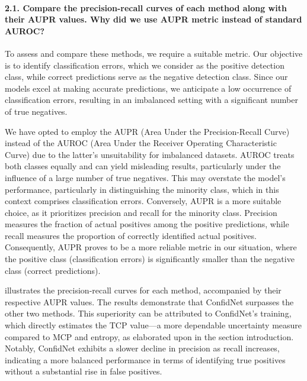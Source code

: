\paragraph*{2.1. Compare the precision-recall curves of each method along with their AUPR values. Why did we use AUPR metric instead of standard AUROC?}
To assess and compare these methods, we require a suitable metric. Our objective is to identify classification errors, which we consider as the positive detection class, while correct predictions serve as the negative detection class. Since our models excel at making accurate predictions, we anticipate a low occurrence of classification errors, resulting in an imbalanced setting with a significant number of true negatives.

We have opted to employ the AUPR (Area Under the Precision-Recall Curve) instead of the AUROC (Area Under the Receiver Operating Characteristic Curve) due to the latter's unsuitability for imbalanced datasets. AUROC treats both classes equally and can yield misleading results, particularly under the influence of a large number of true negatives. This may overstate the model's performance, particularly in distinguishing the minority class, which in this context comprises classification errors. Conversely, AUPR is a more suitable choice, as it prioritizes precision and recall for the minority class. Precision measures the fraction of actual positives among the positive predictions, while recall measures the proportion of correctly identified actual positives. Consequently, AUPR proves to be a more reliable metric in our situation, where the positive class (classification errors) is significantly smaller than the negative class (correct predictions).

 illustrates the precision-recall curves for each method, accompanied by their respective AUPR values. The results demonstrate that ConfidNet surpasses the other two methods. This superiority can be attributed to ConfidNet's training, which directly estimates the TCP value—a more dependable uncertainty measure compared to MCP and entropy, as elaborated upon in the section introduction. Notably, ConfidNet exhibits a slower decline in precision as recall increases, indicating a more balanced performance in terms of identifying true positives without a substantial rise in false positives.

